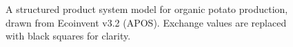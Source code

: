 \begin{figure}
  
  \caption{A structured product system model for organic potato production, drawn from Ecoinvent v3.2 (APOS). Exchange values are replaced with black squares for clarity.}
  \label{table:potato}
\end{figure}
